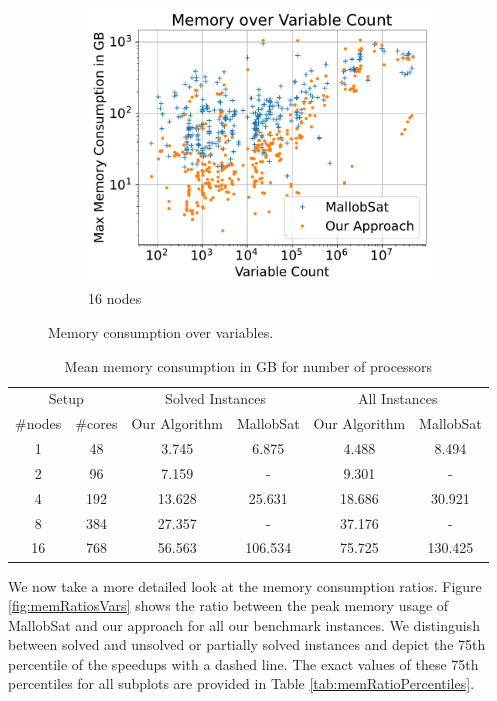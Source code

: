 \documentclass[12pt,a4paper,twoside]{scrartcl}
\numberwithin{equation}{section}
\begin{document}
\begin{figure}[!h]
\begin{subfigure}[c]{.45\textwidth}
    \center
    \includegraphics[scale=.45]{plots/16node_compare/mem_abs_over_vars.pdf}
    \caption{16 nodes}
  \end{subfigure}
  \caption{Memory consumption over variables.}
  \label{fig:memAbsVars}
\end{figure}

\begin{table}[!h]
  \center
  \begin{tabular}{ cccccc }
    \toprule
    \multicolumn{2}{c}{Setup} & \multicolumn{2}{c}{Solved Instances} & \multicolumn{2}{c}{All Instances}\\
    \#nodes & \#cores & Our Algorithm & MallobSat & Our Algorithm & MallobSat \\
    \midrule
    1  & 48  & 3.745  & 6.875   & 4.488   & 8.494\\
    2  & 96  & 7.159  & -       & 9.301   & -\\
    4  & 192 & 13.628 & 25.631  & 18.686  & 30.921\\
    8  & 384 & 27.357 & -       & 37.176  & -\\
    16 & 768 & 56.563 & 106.534 & 75.725 & 130.425\\
    \bottomrule
  \end{tabular}
  \caption{Mean memory consumption in GB for number of processors}
  \label{tab:memMean}
\end{table}

\label{sec:peakMemRatios}
We now take a more detailed look at the memory consumption ratios. Figure \ref{fig:memRatiosVars} shows the ratio between the peak memory usage of MallobSat and our approach for all our benchmark instances. We distinguish between solved and unsolved or partially solved instances and depict the 75th percentile of the speedups with a dashed line. The exact values of these 75th percentiles for all subplots are provided in Table \ref{tab:memRatioPercentiles}.
\end{document}

